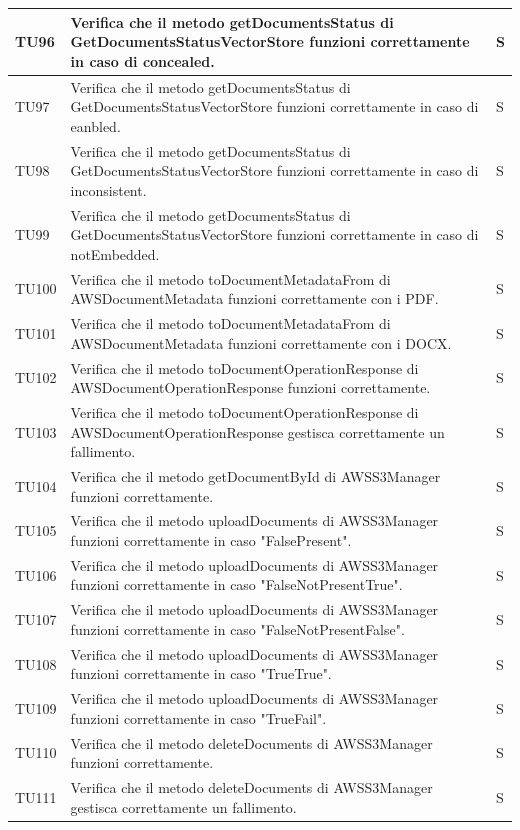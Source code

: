 \documentclass[10pt, a4paper]{article}
\begin{document}
\begin{xltabular}{\textwidth}{p{0.12\textwidth}|p{0.7\textwidth}|X}
\hline
TU96 & Verifica che il metodo getDocumentsStatus di GetDocumentsStatusVectorStore funzioni correttamente in caso di concealed. & S \\
\hline
TU97 & Verifica che il metodo getDocumentsStatus di GetDocumentsStatusVectorStore funzioni correttamente in caso di eanbled. & S \\
\hline
TU98 & Verifica che il metodo getDocumentsStatus di GetDocumentsStatusVectorStore funzioni correttamente in caso di inconsistent. & S \\
\hline
TU99 & Verifica che il metodo getDocumentsStatus di GetDocumentsStatusVectorStore funzioni correttamente in caso di notEmbedded. & S \\
\hline
TU100 & Verifica che il metodo toDocumentMetadataFrom di AWSDocumentMetadata funzioni correttamente con i PDF. & S \\
\hline
TU101 & Verifica che il metodo toDocumentMetadataFrom di AWSDocumentMetadata funzioni correttamente con i DOCX. & S \\
\hline
TU102 & Verifica che il metodo toDocumentOperationResponse di AWSDocumentOperationResponse funzioni correttamente. & S \\
\hline
TU103 & Verifica che il metodo toDocumentOperationResponse di AWSDocumentOperationResponse gestisca correttamente un fallimento. & S \\
\hline
TU104 & Verifica che il metodo getDocumentById di AWSS3Manager funzioni correttamente. & S \\
\hline
TU105 & Verifica che il metodo uploadDocuments di AWSS3Manager funzioni correttamente in caso "FalsePresent". & S \\
\hline
TU106 & Verifica che il metodo uploadDocuments di AWSS3Manager funzioni correttamente in caso "FalseNotPresentTrue". & S \\
\hline
TU107 & Verifica che il metodo uploadDocuments di AWSS3Manager funzioni correttamente in caso "FalseNotPresentFalse". & S \\
\hline
TU108 & Verifica che il metodo uploadDocuments di AWSS3Manager funzioni correttamente in caso "TrueTrue". & S \\
\hline
TU109 & Verifica che il metodo uploadDocuments di AWSS3Manager funzioni correttamente in caso "TrueFail". & S \\
\hline
TU110 & Verifica che il metodo deleteDocuments di AWSS3Manager funzioni correttamente. & S \\
\hline
TU111 & Verifica che il metodo deleteDocuments di AWSS3Manager gestisca correttamente un fallimento. & S \\

\end{xltabular}
\end{document}
